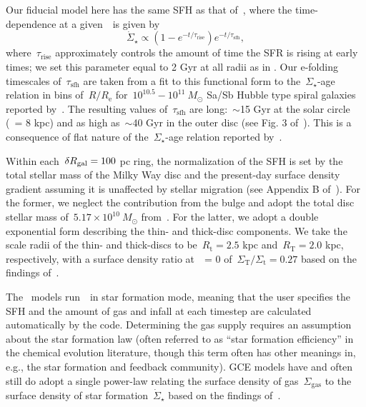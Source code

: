 \documentclass[ms.tex]{subfiles}
\begin{document}
\par
Our fiducial model here has the same SFH as that of~\citet{Johnson2021}, where
the time-dependence at a given~\rgal~is given by
\begin{equation}
\dot{\Sigma}_\star \propto (1 - e^{-t / \tau_\text{rise}})
e^{-t/\tau_\text{sfh}},
\end{equation}
where~$\tau_\text{rise}$ approximately controls the amount of time the SFR is
rising at early times; we set this parameter equal to 2 Gyr at all radii as in
\citet{Johnson2021}.
Our e-folding timescales of~$\tau_\text{sfh}$ are taken from a fit to this
functional form to the~$\Sigma_\star$-age relation in bins of~$R / R_\text{e}$
for~$10^{10.5} - 10^{11}~M_\odot$ Sa/Sb Hubble type spiral galaxies reported
by~\citet{Sanchez2020}.
The resulting values of~$\tau_\text{sfh}$ are long:~$\sim$15 Gyr at the solar
circle (\rgal~= 8 kpc) and as high as~$\sim$40 Gyr in the outer disc (see Fig.
3 of~\citealp{Johnson2021}).
This is a consequence of flat nature of the~$\Sigma_\star$-age relation
reported by~\citet{Sanchez2020}.
\par
Within each~$\delta R_\text{gal} = 100$ pc ring, the normalization of the SFH is set by
the total stellar mass of the Milky Way disc and the present-day surface
density gradient assuming it is unaffected by stellar migration (see Appendix
B of~\citealp{Johnson2021}).
For the former, we neglect the contribution from the bulge and adopt the total
disc stellar mass of~$5.17\times10^{10}~M_\odot$ from~\citet{Licquia2015}.
For the latter, we adopt a double exponential form describing the thin- and
thick-disc components.
We take the scale radii of the thin- and thick-discs to be~$R_\text{t} = 2.5$
kpc and~$R_\text{T} = 2.0$ kpc, respectively, with a surface density ratio
at~\rgal~= 0 of~$\Sigma_\text{T} / \Sigma_\text{t} = 0.27$ based on the
findings of~\citet{Bland-Hawthorn2016}.
\par
The~\citet{Johnson2021} models run~\vice~in star formation mode, meaning that
the user specifies the SFH and the amount of gas and infall at each timestep
are calculated automatically by the code.
Determining the gas supply requires an assumption about the star formation 
law (often referred to as ``star formation efficiency'' in the chemical
evolution literature, though this term often has other meanings in, e.g., the
star formation and feedback community).
GCE models have and often still do adopt a single power-law relating the
surface density of gas~$\Sigma_\text{gas}$ to the surface density of star
formation~$\dot{\Sigma}_\star$ based on the findings of~\citet{Kennicutt1998}.
\end{document}
